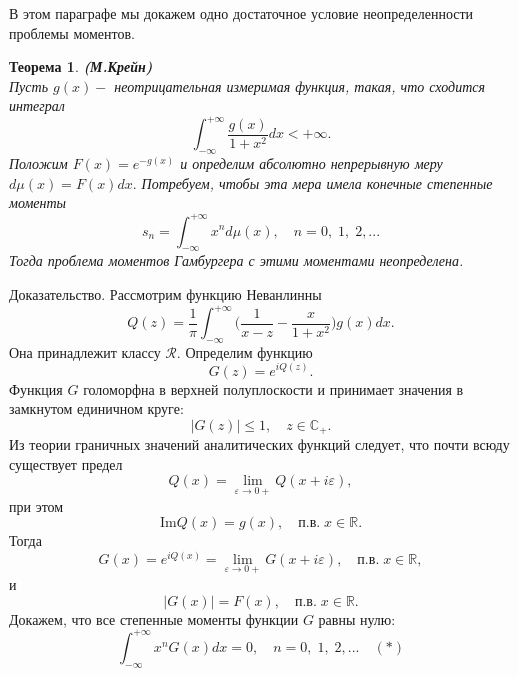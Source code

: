 \documentclass[12pt,a4paper]{article}
\theoremstyle{plain}   \newtheorem{Pro}{Задача}
\newtheorem{The}{Теорема}
\begin{document}
В этом параграфе мы докажем одно достаточное условие
неопределенности проблемы моментов.
\begin{The}
{\bfseries (М.Крейн)}
\\
Пусть
$ g(x) - $
неотрицательная измеримая функция, такая, что сходится интеграл
$$
  \int _{-\infty}^{+\infty}
  \frac{g(x)}{1+x^2}dx<+\infty .
$$
Положим
$ F(x)=e^{-g(x)} $
и определим абсолютно непрерывную меру
$ d\mu (x)=F(x)dx . $
Потребуем, чтобы эта мера имела конечные степенные моменты
$$
  s_n = \int _{-\infty}^{+\infty} x^n d\mu (x),
  \quad n=0, \; 1, \; 2,...
$$
Тогда проблема моментов Гамбургера с этими моментами неопределена.
\end{The}
{\Large Доказательство.}
Рассмотрим функцию Неванлинны
$$
  Q(z)=\frac{1}{\pi} \int _{-\infty}^{+\infty}
  \biggl ( \frac{1}{x-z}-\frac{x}{1+x^2} \biggr )
  g(x)dx.
$$
Она принадлежит классу
$ \mathcal{R} . $
Определим функцию
$$
  G(z)=e^{iQ(z)}.
$$
Функция
$ G $
голоморфна в верхней полуплоскости и принимает значения в
замкнутом единичном круге:
$$
  |G(z)| \leq 1, \quad z \in \mathbb{C}_+ .
$$
Из теории граничных значений аналитических функций следует,
что почти всюду существует предел
$$
  Q(x)= \lim _{\varepsilon \rightarrow 0+}
  Q(x+i \varepsilon ),
$$
при этом
$$
  \mathrm {Im} Q(x)=g(x), \quad п.в. \; x \in \mathbb{R} .
$$
Тогда
$$
  G(x)=e^{iQ(x)}=
  \lim _{\varepsilon \rightarrow 0+}
  G(x+i \varepsilon ),
  \quad п.в. \; x \in \mathbb{R} ,
$$
и
$$
  |G(x)|=F(x), \quad п.в. \; x \in \mathbb{R} .
$$
Докажем, что все степенные моменты функции
$ G $
равны нулю:
$$
  \int _{-\infty}^{+\infty}
  x^n G(x)dx=0, \quad n=0, \; 1, \; 2,...
  \quad (\ast )
$$
\\
\end{document}

